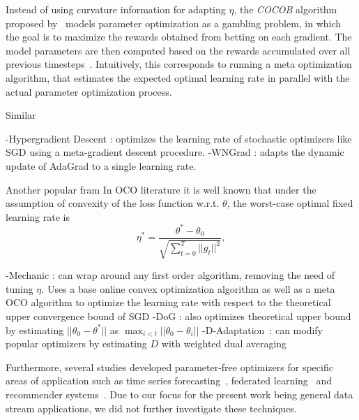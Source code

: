\documentclass[letterpaper]{article} %
\begin{document}
Instead of using curvature information for adapting $\eta$, the \textit{COCOB} algorithm proposed by~\citet{orabonaTrainingDeepNetworks2017} models parameter optimization as a gambling problem, in which the goal is to maximize the rewards obtained from betting on each gradient.
The model parameters are then computed based on the rewards accumulated over all previous timesteps~\cite{orabonaTrainingDeepNetworks2017}.
Intuitively, this corresponds to running a meta optimization algorithm, that estimates the expected optimal learning rate in parallel with the actual parameter optimization process.

Similar 

-Hypergradient Descent \cite{baydinOnlineLearningRate2018}: optimizes the learning rate of stochastic optimizers like SGD using a meta-gradient descent procedure.
-WNGrad \cite{wuWNGradLearnLearning2020}: adapts the dynamic update of AdaGrad to a single learning rate.

Another popular fram
In OCO literature it is well known that under the assumption of convexity of the loss function w.r.t. $\theta$, the worst-case optimal fixed learning rate is
\begin{equation}
	\eta^* = \frac{\theta^* - \theta_0}{\sqrt{\sum_{t=0}^{T} ||g_t||^2}},
\end{equation}

-Mechanic \cite{cutkoskyMechanicLearningRate2023}: can wrap around any first order algorithm, removing the need of tuning $\eta$. Uses a base online convex optimization algorithm as well as a meta OCO algorithm to optimize the learning rate with respect to the theoretical upper convergence bound of SGD
-DoG \cite{ivgiDoGSGDBest2023}: also optimizes theoretical upper bound by estimating $||\theta_0 - \theta^*||$ as $\max_{i<t}||\theta_0 - \theta_i||$
-D-Adaptation~\cite{defazioLearningRateFreeLearningDAdaptation2023a}: can modify popular optimizers by estimating $D$ with weighted dual averaging~\cite{duchiDualAveragingDistributed2012}


Furthermore, several studies developed parameter-free optimizers for specific areas of application such as time series forecasting~\cite{miyaguchiCograConceptDriftAwareStochastic2019,fekriDeepLearningLoad2021, zhangPOLAOnlineTime2021a}, federated learning~\cite{canonacoAdaptiveFederatedLearning2021} and recommender systems~\cite{ferreirajoseADADRIFTAdaptiveLearning2020}.
Due to our focus for the present work being general data stream applications, we did not further investigate these techniques.
\end{document}
